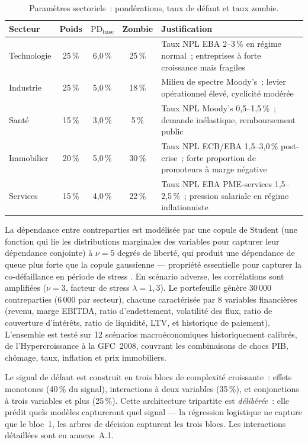 \documentclass[10pt, a4paper, oneside]{report}
\theoremstyle{definition}
\begin{document}
\begin{table}[htbp]
\centering
\caption{Paramètres sectoriels~: pondérations, taux de défaut et taux zombie.}
\label{tab:secteurs}
\begin{tabular}{lccc>{\RaggedRight}p{6.5cm}}
\toprule
Secteur & Poids & $\text{PD}_{\text{base}}$ & Zombie & Justification \\
\midrule
Technologie   & 25\,\% & 6{,}0\,\% & 25\,\% & Taux NPL EBA 2--3\,\% en régime normal~; entreprises à forte croissance mais fragiles \\
Industrie     & 25\,\% & 5{,}0\,\% & 18\,\% & Milieu de spectre Moody's~; levier opérationnel élevé, cyclicité modérée \\
Santé         & 15\,\% & 3{,}0\,\% &  5\,\% & Taux NPL Moody's 0{,}5--1{,}5\,\%~; demande inélastique, remboursement public \\
Immobilier    & 20\,\% & 5{,}0\,\% & 30\,\% & Taux NPL ECB/EBA 1{,}5--3{,}0\,\% post-crise~; forte proportion de promoteurs à marge négative \\
Services      & 15\,\% & 4{,}0\,\% & 22\,\% & Taux NPL EBA PME-services 1{,}5--2{,}5\,\%~; pression salariale en régime inflationniste \\
\bottomrule
\end{tabular}
\end{table}

La dépendance entre contreparties est modélisée par une copule de Student (une fonction qui lie les distributions marginales des variables pour capturer leur dépendance conjointe) à $\nu = 5$ degrés de liberté, qui produit une dépendance de queue plus forte que la copule gaussienne --- propriété essentielle pour capturer la co-défaillance en période de stress \citep{mcneil_frey_embrechts2015}. En scénario adverse, les corrélations sont amplifiées ($\nu = 3$, facteur de stress $\lambda = 1{,}3$). Le portefeuille génère 30\,000 contreparties (6\,000 par secteur), chacune caractérisée par 8 variables financières (revenu, marge EBITDA, ratio d'endettement, volatilité des flux, ratio de couverture d'intérêts, ratio de liquidité, LTV, et historique de paiement). L'ensemble est testé sur 12 scénarios macroéconomiques historiquement calibrés, de l'Hypercroissance à la GFC~2008, couvrant les combinaisons de chocs PIB, chômage, taux, inflation et prix immobiliers.

Le signal de défaut est construit en trois blocs de complexité croissante~: effets monotones (40\,\% du signal), interactions à deux variables (35\,\%), et conjonctions à trois variables et plus (25\,\%). Cette architecture tripartite est \emph{délibérée}~: elle prédit quels modèles captureront quel signal --- la régression logistique ne capture que le bloc~1, les arbres de décision capturent les trois blocs. Les interactions détaillées sont en annexe~A.1.
\end{document}
